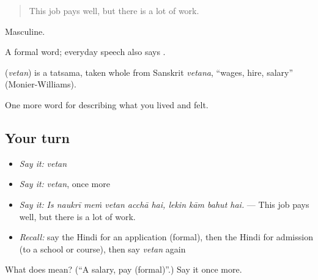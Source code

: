\begin{quote}
This job pays well, but there is a lot of work.
\end{quote}

Masculine.

A formal word; everyday speech also says .

\begin{cousinweb}
\textbf{} (\emph{vetan}) is a tatsama, taken whole from Sanskrit \emph{vetana}, \textquotedblleft{}wages, hire, salary\textquotedblright{} (Monier-Williams).
\end{cousinweb}

\begin{grammarlens}[title={What you've built}]
One more word for describing what you lived and felt.
\end{grammarlens}

\subsection*{Your turn}
\begin{itemize}
\raggedright
  \item \emph{Say it:} \emph{vetan}
  \item \emph{Say it:} \emph{vetan}, once more
  \item \emph{Say it:} \emph{Is naukrī meṁ vetan acchā hai, lekin kām bahut hai.} — This job pays well, but there is a lot of work.
  \item \emph{Recall:} say the Hindi for an application (formal), then the Hindi for admission (to a school or course), then say \emph{vetan} again
\end{itemize}

\begin{tcolorbox}[breakable,colback=teal!4,colframe=teal!35!black,title={Before you move on}]
What does  mean? (\textquotedblleft{}A salary, pay (formal)\textquotedblright{}.) Say it once more.
\end{tcolorbox}
